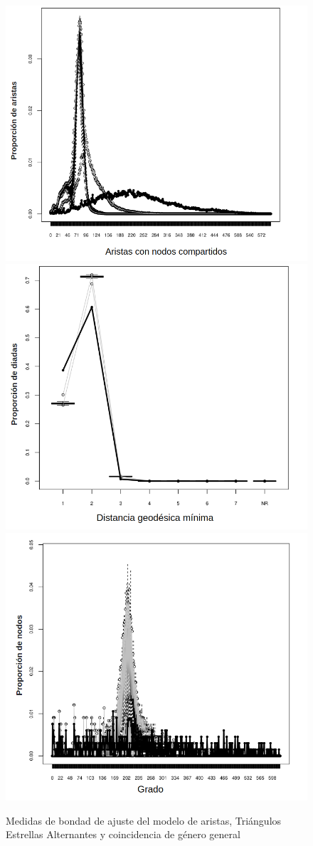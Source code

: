 \begin{figure}[!ht]
\includegraphics[width=.5\textwidth]{Tesis/Figures/gof_2_aristas_compartidas.png}
\includegraphics[width=.5\textwidth]{Tesis/Figures/gof_2_distancia.png}
\includegraphics[width=.5\textwidth]{Tesis/Figures/gof_2_grado.png}
\caption{Medidas de bondad de ajuste del modelo de aristas, Triángulos Estrellas Alternantes  y coincidencia de género general}
\end{figure}


